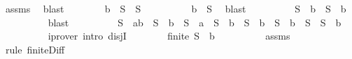 \begin{isabellebody}
\ assms{\isacharparenleft}{}{\isacharparenright}\ \isamarkupfalse%
\ blast\isanewline
\ \ \ \ \ \ \isamarkupfalse%
\ {\isachardoublequoteopen}{\isacharbraceleft}b{\isacharbraceright}\ {\isasymunion}\ S\ {\isacharequal}\ S{\isachardoublequoteclose}\isanewline
\ \ \ \ \ \ \ \ \isamarkupfalse%
\ {\isacartoucheopen}b\ {\isasymin}\ S{\isacartoucheclose}\ \isamarkupfalse%
\ blast\isanewline
\ \ \ \ \ \ \isamarkupfalse%
\ \isamarkupfalse%
\ {\isachardoublequoteopen}S\ {\isacharequal}\ {\isacharbraceleft}b{\isacharbraceright}\ {\isasymunion}\ {\isacharparenleft}S\ {\isacharminus}\ {\isacharbraceleft}b{\isacharbraceright}{\isacharparenright}{\isachardoublequoteclose}\ \isanewline
\ \ \ \ \ \ \ \ \isamarkupfalse%
\ blast\isanewline
\ \ \ \ \ \ \isamarkupfalse%
\ \isamarkupfalse%
\ {}{\isacharcolon}{\isachardoublequoteopen}S\ {\isacharequal}\ {\isacharbraceleft}a{\isacharcomma}b{\isacharbraceright}\ {\isasymunion}\ {\isacharparenleft}S\ {\isacharminus}\ {\isacharbraceleft}b{\isacharbraceright}{\isacharparenright}\ {\isasymor}\ S\ {\isacharequal}\ {\isacharbraceleft}a{\isacharbraceright}\ {\isasymunion}\ {\isacharparenleft}S\ {\isacharminus}\ {\isacharbraceleft}b{\isacharbraceright}{\isacharparenright}\ {\isasymor}\ S\ {\isacharequal}\ {\isacharbraceleft}b{\isacharbraceright}\ {\isasymunion}\ {\isacharparenleft}S\ {\isacharminus}\ {\isacharbraceleft}b{\isacharbraceright}{\isacharparenright}\ {\isasymor}\ S\ {\isacharequal}\ {\isacharparenleft}S\ {\isacharminus}\ {\isacharbraceleft}b{\isacharbraceright}{\isacharparenright}{\isachardoublequoteclose}\isanewline
\ \ \ \ \ \ \ \ \isamarkupfalse%
\ {\isacharparenleft}iprover\ intro{\isacharcolon}\ disjI{}{\isacharparenright}\isanewline
\ \ \ \ \ \ \isamarkupfalse%
\ {\isachardoublequoteopen}finite\ {\isacharparenleft}S\ {\isacharminus}\ {\isacharbraceleft}b{\isacharbraceright}{\isacharparenright}{\isachardoublequoteclose}\isanewline
\ \ \ \ \ \ \ \ \isamarkupfalse%
\ assms{\isacharparenleft}{}{\isacharparenright}\ \isamarkupfalse%
\ {\isacharparenleft}rule\ finite{\isacharunderscore}Diff{\isacharparenright}\isanewline
\ \ \ \ \ \ \isamarkupfalse%
\ \isamarkupfalse%

\end{isabellebody}
